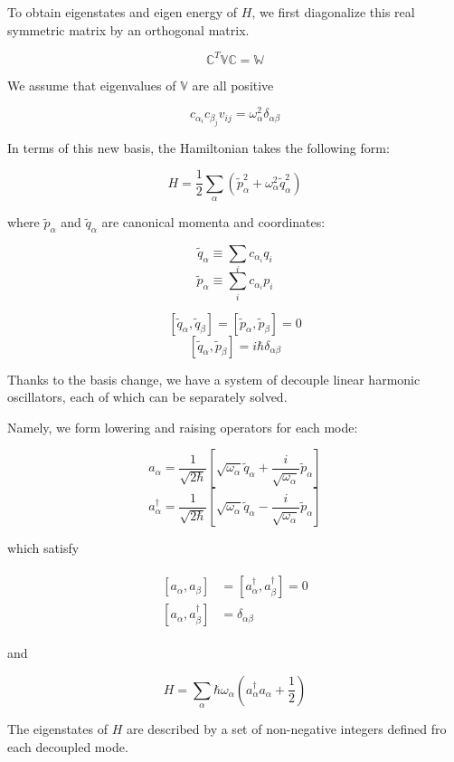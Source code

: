 To obtain eigenstates and eigen energy of $H$, we first diagonalize this real symmetric matrix by an orthogonal matrix. 

\[\mathbb{C}^T \mathbb{V}\mathbb{C} = \mathbb{W} \]

We assume that eigenvalues of $\mathbb{V}$ are all positive

\[c_{\alpha_i}c_{\beta_j}v_{ij} = \omega_{\alpha}^2\delta_{\alpha\beta} \]

In terms of this new basis, the Hamiltonian takes the following form:

\[H = \frac{1}{2}\sum_{\alpha}(\tilde{p}_{\alpha}^2+\omega_{\alpha}^2\tilde{q}_{\alpha}^2) \]

where $\tilde{p}_{\alpha}$ and $\tilde{q}_{\alpha}$ are canonical momenta and coordinates:

\[\tilde{q}_{\alpha}\equiv \sum_i c_{\alpha_i}q_i \]
\[\tilde{p}_{\alpha}\equiv \sum_i c_{\alpha_i}p_i \]

\[[\tilde{q}_{\alpha},\tilde{q}_{\beta}] = [\tilde{p}_{\alpha},\tilde{p}_{\beta}] = 0 \]
\[[\tilde{q}_{\alpha},\tilde{p}_{\beta}] = i\hbar\delta_{\alpha\beta} \]

Thanks to the basis change, we have a system of decouple linear harmonic oscillators, each of which can be separately solved. 

Namely, we form lowering and raising operators for each mode:

\[a_{\alpha} = \frac{1}{\sqrt{2\hbar}}\left[\sqrt{\omega_{\alpha}}\tilde{q}_{\alpha}+\frac{i}{\sqrt{\omega_{\alpha}}}\tilde{p}_{\alpha}\right] \]
\[a_{\alpha}^\dagger = \frac{1}{\sqrt{2\hbar}}\left[\sqrt{\omega_{\alpha}}\tilde{q}_{\alpha}-\frac{i}{\sqrt{\omega_{\alpha}}}\tilde{p}_{\alpha}\right] \]

which satisfy

\begin{align}\label{Eqs1.3.2}
\begin{split}
[a_{\alpha},a_{\beta}] & = [a_\alpha^\dagger, a_\beta^\dagger] = 0\\
[a_\alpha,a_\beta^\dagger] &= \delta_{\alpha\beta}
\end{split}
\end{align}

and

\[H = \sum_\alpha \hbar\omega_\alpha(a^\dagger_\alpha a_\alpha + \frac{1}{2}) \]

The eigenstates of $H$ are described by a set of non-negative integers defined fro each decoupled mode. 


